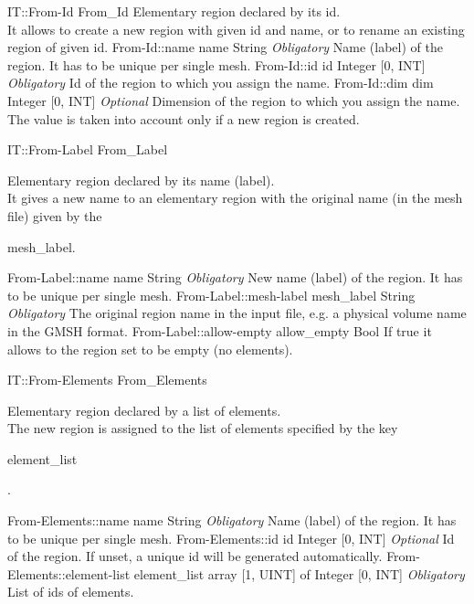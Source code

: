 \begin{RecordType}
	{IT::From-Id}
	{From{\_}Id}
	{}%
	{}%
	{{{Elementary region declared by its id.}\\{
It allows to create a new region with given id and name, or to rename an existing region of given id.}%
}}
		\RecKey
			{From-Id::name}
			{name}
			{{String}}{}
			{ \it{Obligatory}}
			{{{Name (label) of the region.
It has to be unique per single mesh.}%
}}
		\RecKey
			{From-Id::id}
			{id}
			{{Integer [0, INT]}}{}
			{ \it{Obligatory}}
			{{{Id of the region to which you assign the name.}%
}}
		\RecKey
			{From-Id::dim}
			{dim}
			{{Integer [0, INT]}}{}
			{ \it{Optional}}
			{{{Dimension of the region to which you assign the name.}\\{
The value is taken into account only if a new region is created.}%
}}
\end{RecordType}
\begin{RecordType}
	{IT::From-Label}
	{From{\_}Label}
	{}%
	{}%
	{{{Elementary region declared by its name (label).}\\{
It gives a new name to an elementary region with the original name (in the mesh file) given by the }\begin{ttfamily}mesh{\_}label.\end{ttfamily}%
}}
		\RecKey
			{From-Label::name}
			{name}
			{{String}}{}
			{ \it{Obligatory}}
			{{{New name (label) of the region.
It has to be unique per single mesh.}%
}}
		\RecKey
			{From-Label::mesh-label}
			{mesh{\_}label}
			{{String}}{}
			{ \it{Obligatory}}
			{{{The original region name in the input file, e.g. a physical volume name in the GMSH format.}%
}}
		\RecKey
			{From-Label::allow-empty}
			{allow{\_}empty}
			{{Bool}}{}
			{ }
			{{{If true it allows to the region set to be empty (no elements).}%
}}
\end{RecordType}
\begin{RecordType}
	{IT::From-Elements}
	{From{\_}Elements}
	{}%
	{}%
	{{{Elementary region declared by a list of elements.}\\{
The new region is assigned to the list of elements specified by the key }\begin{ttfamily}element{\_}list\end{ttfamily}{.}%
}}
		\RecKey
			{From-Elements::name}
			{name}
			{{String}}{}
			{ \it{Obligatory}}
			{{{Name (label) of the region.
It has to be unique per single mesh.}%
}}
		\RecKey
			{From-Elements::id}
			{id}
			{{Integer [0, INT]}}{}
			{ \it{Optional}}
			{{{Id of the region.
If unset, a unique id will be generated automatically.}%
}}
		\RecKey
			{From-Elements::element-list}
			{element{\_}list}
			{{array [1, UINT] of }{Integer [0, INT]}}{}
			{ \it{Obligatory}}
			{{{List of ids of elements.}%
}}
\end{RecordType}
